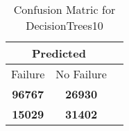 \begin{table}[] 
\caption{Confusion Matric for DecisionTrees10} 
\label{Table: Prediction Accuracy-DMDDecisionTrees10OnlySunEKF-resetReflection-Reflection} 
\centering 
\begin{tabular} 
 {@{}ccc@{}} 
\toprule 
\multicolumn{2}{c}{\textbf{Predicted}}
 \\ \midrule 
\multicolumn{1}{|c|}{Failure} & 
\multicolumn{1}{c|}{No Failure}
 \\ \midrule 
\multicolumn{1}{|c|}{\color{green}\textbf{96767}} & 
\multicolumn{1}{c|}{\color{red}\textbf{26930}}
 \\ \midrule 
\multicolumn{1}{|c|}{\color{red}\textbf{15029}} & 
\multicolumn{1}{c|}{\color{green}\textbf{31402}}
 \\ \bottomrule 
\end{tabular} 
\end{table} 
